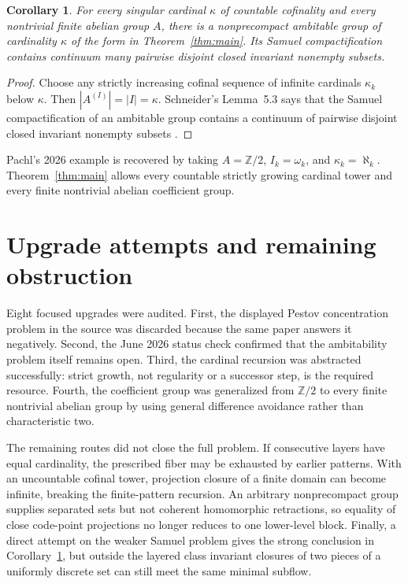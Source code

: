 \documentclass[11pt]{article}
\newtheorem{corollary}[theorem]{Corollary}
\begin{document}
\begin{corollary}\label{cor:cardinals}
For every singular cardinal $\kappa$ of countable cofinality and every
nontrivial finite abelian group $A$, there is a nonprecompact ambitable group
of cardinality $\kappa$ of the form in Theorem~\ref{thm:main}.  Its Samuel
compactification contains continuum many pairwise disjoint closed invariant
nonempty subsets.
\end{corollary}

\begin{proof}
Choose any strictly increasing cofinal sequence of infinite cardinals
$\kappa_k$ below $\kappa$.  Then $|A^{(I)}|=|I|=\kappa$.  Schneider's
Lemma~5.3 says that the Samuel compactification of an ambitable group contains
a continuum of pairwise disjoint closed invariant nonempty subsets
\cite{Schneider}.
\end{proof}

Pachl's 2026 example is recovered by taking $A=\mathbb Z/2$,
$I_k=\omega_k$, and $\kappa_k=\aleph_k$.  Theorem~\ref{thm:main} allows every
countable strictly growing cardinal tower and every finite nontrivial abelian
coefficient group.

\section{Upgrade attempts and remaining obstruction}

Eight focused upgrades were audited.  First, the displayed Pestov
concentration problem in the source was discarded because the same paper
answers it negatively.  Second, the June 2026 status check confirmed that the
ambitability problem itself remains open.  Third, the cardinal recursion was
abstracted successfully: strict growth, not regularity or a successor step,
is the required resource.  Fourth, the coefficient group was generalized
from $\mathbb Z/2$ to every finite nontrivial abelian group by using general
difference avoidance rather than characteristic two.

The remaining routes did not close the full problem.  If consecutive layers
have equal cardinality, the prescribed fiber may be exhausted by earlier
patterns.  With an uncountable cofinal tower, projection closure of a finite
domain can become infinite, breaking the finite-pattern recursion.  An
arbitrary nonprecompact group supplies separated sets but not coherent
homomorphic retractions, so equality of close code-point projections no
longer reduces to one lower-level block.  Finally, a direct attempt on the
weaker Samuel problem gives the strong conclusion in
Corollary~\ref{cor:cardinals}, but outside the layered class invariant closures
of two pieces of a uniformly discrete set can still meet the same minimal
subflow.
\end{document}
